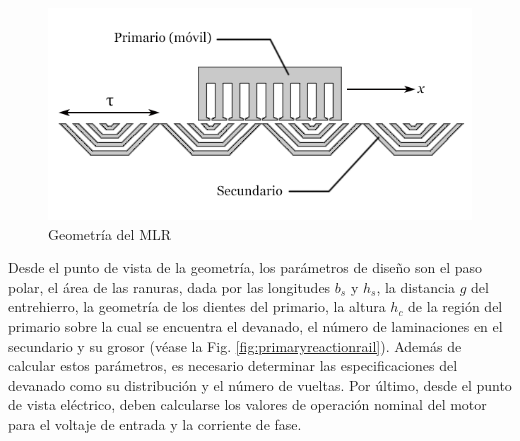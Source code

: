 \begin{figure}[tb]
\centering
\includegraphics[scale=0.8]{../img/Desarrollo_de_un_diseno_inicial/LVRM.png}
\caption{Geometría del MLR}
\label{fig:LVRMdi}
\end{figure}

Desde el punto de vista de la geometría, los parámetros de diseño son el paso polar, el área de las ranuras, dada por las longitudes $b_s$ y $h_s$, la distancia $g$ del entrehierro, la geometría de los dientes del primario, la altura $h_c$ de la región del primario sobre la cual se encuentra el devanado, el número de laminaciones en el secundario y su grosor (véase la Fig. \ref{fig:primaryreactionrail}). Además de calcular estos parámetros, es necesario determinar las especificaciones del devanado como su distribución y el número de vueltas. Por último, desde el punto de vista eléctrico, deben calcularse los valores de operación nominal del motor para el voltaje de entrada y la corriente de fase.

